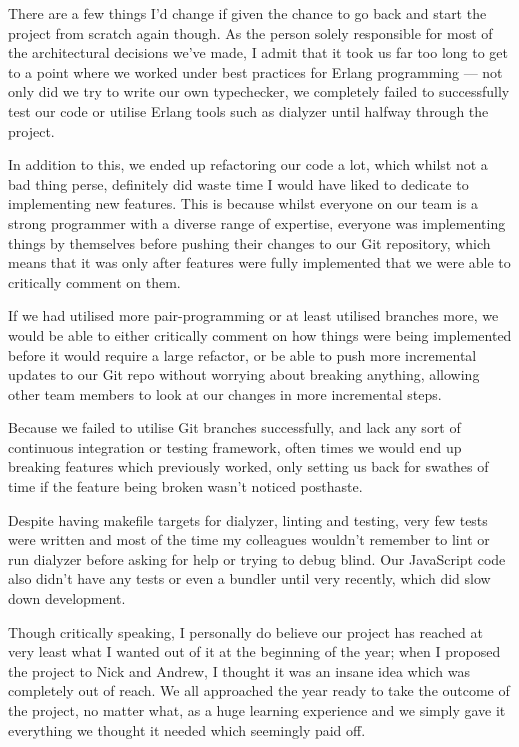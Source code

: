 \documentclass[twoside,12pt,titlepage,a4paper]{article}
\begin{document}
	There are a few things I'd change if given the chance to go back and start the project from scratch again though. As the person
	solely responsible for most of the architectural decisions we've made, I admit that it took us far too long to get to a point
	where we worked under best practices for Erlang programming --- not only did we try to write our own typechecker, we completely
	failed to successfully test our code or utilise Erlang tools such as dialyzer until halfway through the project.

	In addition to this, we ended up refactoring our code a lot, which whilst not a bad thing perse, definitely did waste time I would
	have liked to dedicate to implementing new features. This is because whilst everyone on our team is a strong programmer with a diverse
	range of expertise, everyone was implementing things by themselves before pushing their changes to our Git repository, which means that
	it was only after features were fully implemented that we were able to critically comment on them.

	If we had utilised more pair-programming or at least utilised branches more, we would be able to either critically comment on
	how things were being implemented before it would require a large refactor, or be able to push more incremental updates to our
	Git repo without worrying about breaking anything, allowing other team members to look at our changes in more incremental steps.

	Because we failed to utilise Git branches successfully, and lack any sort of continuous integration or testing
	framework, often times we would end up breaking features which previously worked, only setting us back for swathes of time if
	the feature being broken wasn't noticed posthaste. 
	
	Despite having makefile targets for dialyzer, linting and testing, 
	very few tests were written and most of the time my colleagues wouldn't remember to lint or run dialyzer before asking for help
	or trying to debug blind. Our JavaScript code also didn't have any tests or even a bundler until very recently, which did
	slow down development.

	Though critically speaking, I personally do believe our project has reached at very least what I wanted out of it at the beginning
	of the year; when I proposed the project to Nick and Andrew, I thought it was an insane idea which was completely out of reach. 
	We all approached the year ready to take the outcome of the project, no matter what, as a huge learning experience and we simply
	gave it everything we thought it needed which seemingly paid off.
\end{document}
